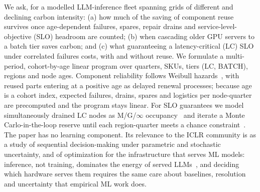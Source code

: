 \documentclass{article} %
\begin{document}
We ask, for a modelled LLM-inference fleet spanning grids of different and declining carbon intensity: (a) how much of the saving of component reuse survives once age-dependent failures, spares, repair drains and service-level-objective (SLO) headroom are counted; (b) when cascading older GPU servers to a batch tier saves carbon; and (c) what guaranteeing a latency-critical (LC) SLO under correlated failures costs, with and without reuse. We formulate a multi-period, cohort-by-age linear program over quarters, SKUs, tiers (LC, BATCH), regions and node ages. Component reliability follows Weibull hazards~\citep{Weibull1951StatisticalDistribution}, with reused parts entering at a positive age as delayed renewal processes; because age is a cohort index, expected failures, drains, spares and logistics per node-quarter are precomputed and the program stays linear. For SLO guarantees we model simultaneously drained LC nodes as M/G/$\infty$ occupancy~\citep{Eick1993PhysicsMtg} and iterate a Monte Carlo-in-the-loop reserve until each region-quarter meets a chance constraint~\citep{Cohen2017OvercommitmentCloud}. The paper has no learning component. Its relevance to the ICLR community is as a study of sequential decision-making under parametric and stochastic uncertainty, and of optimization for the infrastructure that serves ML models: inference, not training, dominates the energy of served LLMs~\citep{Niu2026TokenpowerbenchBenchmarking}, and deciding which hardware serves them requires the same care about baselines, resolution and uncertainty that empirical ML work does.
\end{document}
